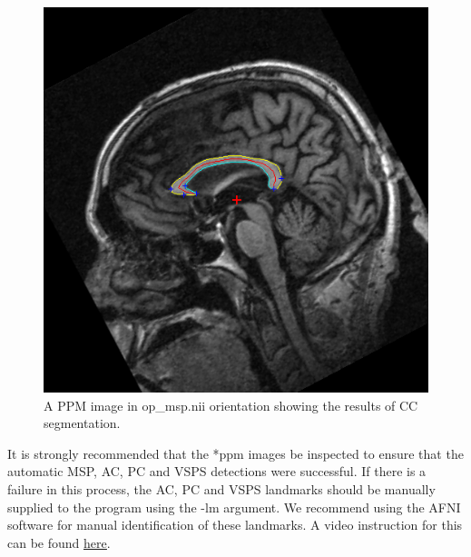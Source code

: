 \documentclass[11pt]{article}
\begin{document}
\begin{figure}[H]
\begin{center}
\includegraphics[scale=.5]{op_cc.jpg}
\caption{
A PPM image in op\_msp.nii orientation showing the results of CC
segmentation.  
}
\label{fig:op}
\end{center}
\end{figure}

It is strongly recommended that the *ppm images be inspected to ensure that 
the automatic MSP, AC, PC and VSPS detections were successful.  
If there is a failure in this process, the AC, PC and VSPS landmarks should be
manually supplied to the program  using the -lm argument. 
We recommend
using the AFNI software for manual identification of these landmarks. 
A video instruction for this can be found 
\href{https://www.youtube.com/watch?v=q5GBaNnjOa8}{\underline{here}}.


\end{document}
